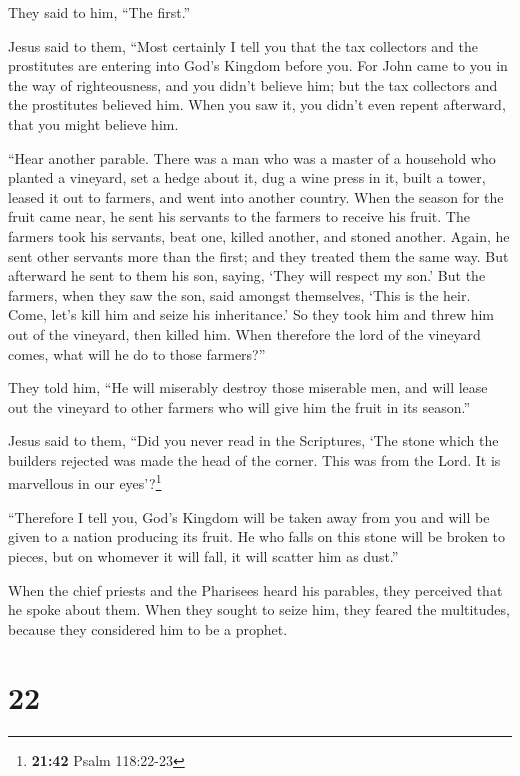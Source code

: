 They said to him, ``The first.''

Jesus said to them, ``Most certainly I tell you that the tax collectors
and the prostitutes are entering into God's Kingdom before you.
 For John came to you in the way of righteousness, and
you didn't believe him; but the tax collectors and the prostitutes
believed him. When you saw it, you didn't even repent afterward, that
you might believe him.

 ``Hear another parable. There was a man who was a master
of a household who planted a vineyard, set a hedge about it, dug a wine
press in it, built a tower, leased it out to farmers, and went into
another country.  When the season for the fruit came
near, he sent his servants to the farmers to receive his fruit.
 The farmers took his servants, beat one, killed another,
and stoned another.  Again, he sent other servants more
than the first; and they treated them the same way.  But
afterward he sent to them his son, saying, `They will respect my son.'
 But the farmers, when they saw the son, said amongst
themselves, `This is the heir. Come, let's kill him and seize his
inheritance.'  So they took him and threw him out of the
vineyard, then killed him.  When therefore the lord of
the vineyard comes, what will he do to those farmers?''

 They told him, ``He will miserably destroy those
miserable men, and will lease out the vineyard to other farmers who will
give him the fruit in its season.''

 Jesus said to them, ``Did you never read in the
Scriptures, `The stone which the builders rejected was made the head of
the corner. This was from the Lord. It is marvellous in our
eyes'?\footnote{\textbf{21:42} Psalm 118:22-23}

 ``Therefore I tell you, God's Kingdom will be taken away
from you and will be given to a nation producing its fruit.
 He who falls on this stone will be broken to pieces, but
on whomever it will fall, it will scatter him as dust.''

 When the chief priests and the Pharisees heard his
parables, they perceived that he spoke about them.  When
they sought to seize him, they feared the multitudes, because they
considered him to be a prophet.

\hypertarget{section-21}{%
\section{22}\label{section-21}}

